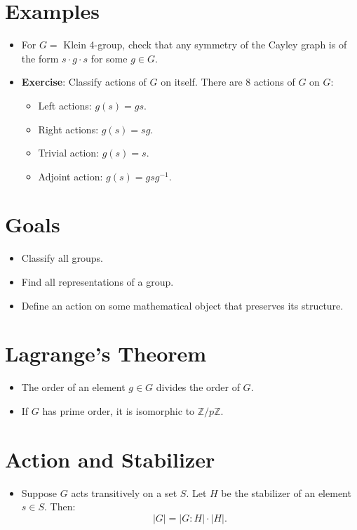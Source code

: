 \documentclass{article}
\begin{document}
\section*{Examples}
\begin{itemize}
    \item For \( G = \) Klein 4-group, check that any symmetry of the Cayley graph is of the form $s \cdot g \cdot s$ for some $g \in G$.
    \item \textbf{Exercise}: Classify actions of $G$ on itself. There are 8 actions of $G$ on $G$:
    \begin{itemize}
        \item Left actions: \( g(s) = gs \).
        \item Right actions: \( g(s) = sg \).
        \item Trivial action: \( g(s) = s \).
        \item Adjoint action: \( g(s) = gsg^{-1} \).
    \end{itemize}
\end{itemize}

\section*{Goals}
\begin{itemize}
    \item Classify all groups.
    \item Find all representations of a group.
    \item Define an action on some mathematical object that preserves its structure.
\end{itemize}

\section*{Lagrange's Theorem}
\begin{itemize}
    \item The order of an element \( g \in G \) divides the order of \( G \).
    \item If \( G \) has prime order, it is isomorphic to \( \mathbb{Z}/p\mathbb{Z} \).
\end{itemize}

\section*{Action and Stabilizer}
\begin{itemize}
    \item Suppose $G$ acts transitively on a set $S$. Let $H$ be the stabilizer of an element $s \in S$. Then:
    \[
    |G| = |G : H| \cdot |H|.
    \]
\end{itemize}
\end{document}
